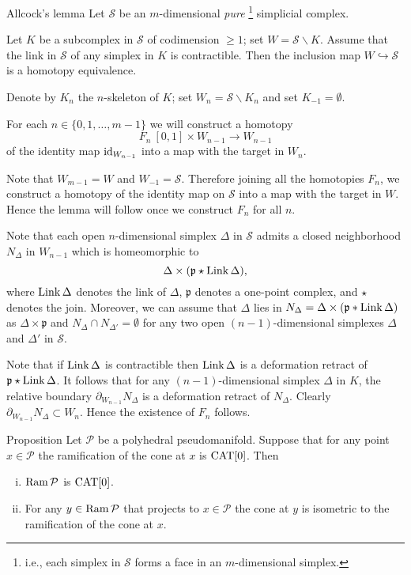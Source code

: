 \documentclass[oneside,a4paper]{article}
\def\Ram{\mathop{\rm Ram}\nolimits}
\def\Link{\mathop{\rm Link}}
\begin{document}
\begin{thm}{Allcock's lemma}\label{lem:allcock}
Let $\mathcal{S}$ be an $m$-dimensional \emph{pure}%
\footnote{i.e., each simplex in $\mathcal{S}$ forms a face in an $m$-dimensional simplex.} simplicial complex.

Let $K$ be a subcomplex in $\mathcal{S}$ of codimension $\ge 1$;
set $W=\mathcal{S}\backslash K$.
Assume that the link in  $\mathcal{S}$  of any simplex in $K$ is contractible.
Then the inclusion map $W\hookrightarrow\mathcal{S}$ is a homotopy equivalence.
\end{thm}


Denote by $K_n$ the $n$-skeleton of $K$;
set $W_n=\mathcal{S}\backslash K_n$
and
set $K_{-1}=\emptyset$.

For each $n\in \{0,1,\dots,m-1\}$
we will construct a homotopy
$$F_n\:[0,1]\times W_{n-1}\to W_{n-1}$$
of the identity map $\mathop{\rm id}\nolimits_{W_{n-1}}$
into a map with the target in $W_{n}$.

Note that $W_{m-1}=W$ and $W_{-1}=\mathcal{S}$.
Therefore joining all the homotopies $F_n$,
we construct a  homotopy of the identity map on ${\mathcal{S}}$ into a map with the target in $W$.
Hence the lemma will follow once we construct  $F_n$ for all $n$.

Note that each open $n$-dimensional simplex $\Delta$ in $\mathcal{S}$ admits a closed neighborhood $N_\Delta$ in $W_{n-1}$ which is homeomorphic to
$$\Delta\times (\mathfrak{p}\star\Link\Delta),$$
where $\Link\Delta$ denotes the link of $\Delta$,
$\mathfrak{p}$ denotes a one-point complex, and ${\star}$ denotes the join.
Moreover, we can assume that $\Delta$ lies in $N_\Delta=\Delta\times (\mathfrak{p}*\Link\Delta)$ as $\Delta\times \mathfrak{p}$
and $N_\Delta\cap N_{\Delta'}=\emptyset$ for any two open $(n-1)$-dimensional simplexes $\Delta$ and $\Delta'$ in $\mathcal{S}$.

Note that if $\Link\Delta$ is contractible
then  $\Link\Delta$ is a deformation retract of $\mathfrak{p}\star\Link\Delta$.
It follows that for any $(n-1)$-dimensional simplex $\Delta$ in $K$,
the relative boundary  $\partial_{W_{n-1}}N_\Delta$
is a deformation retract of $N_\Delta$.
Clearly $\partial_{W_{n-1}}N_\Delta\subset W_n$.
Hence the existence of $F_n$ follows.
\qeds


\begin{thm}{Proposition}\label{orbianalog}
Let $\mathcal P$ be a polyhedral pseudomanifold.
Suppose that for any point $x\in \mathcal P$ the ramification of the cone at $x$ is $\mathrm{CAT}[0]$.
Then
\begin{enumerate}[(i)]
\item\label{orbianalog:i} $\Ram \mathcal P$ is $\mathrm{CAT}[0]$.
\item\label{orbianalog:ii} For any $y\in \Ram \mathcal P$ that projects to $x\in \mathcal P$
the cone at $y$ is isometric to the ramification of the cone at $x$.
\end{enumerate}
\end{thm}
\end{document}
